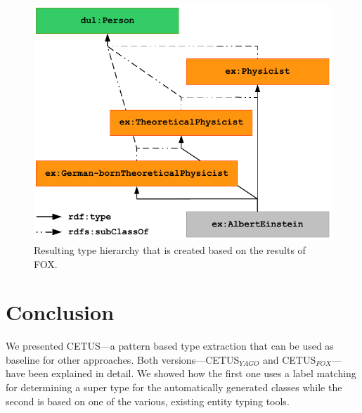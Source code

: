 \begin{figure}[htb!]
\centering
\includegraphics[scale=0.8]{chapter_three/unstructured_annotation/fig/localFOXHierarchy.pdf}
\caption{Resulting type hierarchy that is created based on the results of FOX.}
\label{fig:localFOXHierarchy}
\end{figure}

\section{Conclusion}
\label{cha321:sec:conclusion}

We presented CETUS---a pattern based type extraction that can be used as baseline for other approaches.
Both versions---CETUS$_{YAGO}$ and CETUS$_{FOX}$---have been explained in detail.
We showed how the first one uses a label matching for determining a super type for the automatically generated classes while the second is based on one of the various, existing entity typing tools.

